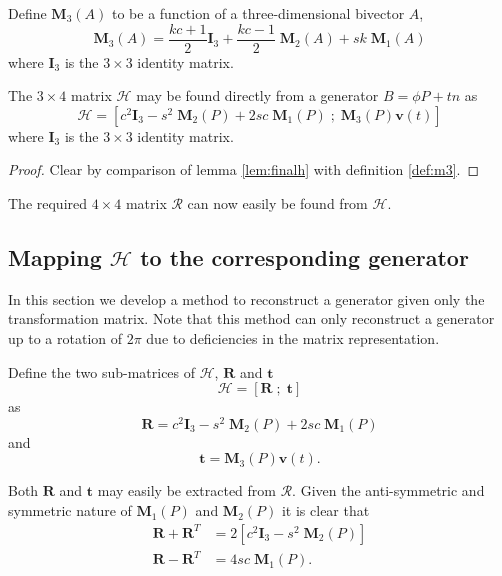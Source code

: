 \begin{definition}
\label{def:m3}
Define $\mathbf{M}_3(A)$ to be a function of a three-dimensional bivector $A$,
\[
\mathbf{M}_3(A) = \frac{kc+1}{2} \mathbf{I}_3 
+ \frac{kc-1}{2} \;\mathbf{M}_2(A) + sk\;\mathbf{M}_1(A)
\]
where  $\mathbf{I}_3$ is the $3\times3$ identity matrix.
\end{definition}

\begin{thm}
The $3\times4$ matrix $\mathcal{H}$ may be found directly from a
generator $B=\phi P + tn$ as
\[
\mathcal{H} = \left[
 c^2\mathbf{I}_3 - s^2\;\mathbf{M}_2(P) + 2sc\;\mathbf{M}_1(P) \; ; \;
 \mathbf{M}_3(P)\mathbf{v}(t)
\right]
\]
where  $\mathbf{I}_3$ is the $3\times3$ identity matrix.
\begin{proof}
Clear by comparison of lemma \ref{lem:finalh} with definition \ref{def:m3}.
\end{proof}
\end{thm}

\noindent The required $4\times4$ matrix $\mathcal{R}$ can now easily be found from $\mathcal{H}$.

\subsection{Mapping $\mathcal{H}$ to the corresponding generator}

In this section we develop a method to reconstruct a generator given only the
transformation matrix. Note that this method can only reconstruct a generator
up to a rotation of $2\pi$ due to deficiencies in the matrix representation.

\begin{definition}
Define the two sub-matrices of $\mathcal{H}$,
$\mathbf{R}$ and $\mathbf{t}$
\[
\mathcal{H} = [ \mathbf{R}\; ; \; \mathbf{t} ]
\]
as 
\begin{equation}
\mathbf{R} = c^2\mathbf{I}_3 - s^2\;\mathbf{M}_2(P) + 2sc\;\mathbf{M}_1(P)\label{eqn:A}
\end{equation}
and
\begin{equation}
\mathbf{t} = \mathbf{M}_3(P)\mathbf{v}(t). \label{eqn:b}
\end{equation}
\end{definition}

Both $\mathbf{R}$ and $\mathbf{t}$ may easily be extracted from $\mathcal{R}$.
Given the anti-symmetric and symmetric nature
of $\mathbf{M}_1(P)$ and $\mathbf{M}_2(P)$ it is clear that
\begin{align*}
\mathbf{R} + \mathbf{R}^T &= 
2\left[ c^2\mathbf{I}_3 - s^2\;\mathbf{M}_2(P) \right] \\
\mathbf{R} - \mathbf{R}^T &= 
4sc\;\mathbf{M}_1(P).
\end{align*} 


